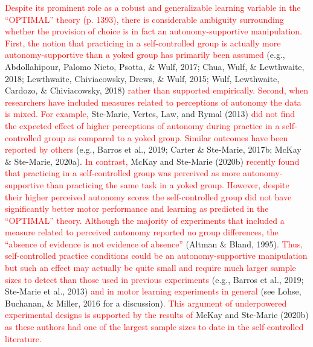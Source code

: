 \documentclass[
  english,
  man, donotrepeattitle,floatsintext]{apa7}
\begin{document}
\textcolor{red}{Despite its prominent role as a robust and generalizable learning variable in the ``OPTIMAL'' theory (p. 1393), there is considerable ambiguity surrounding whether the provision of choice is in fact an autonomy-supportive manipulation. First, the notion that practicing in a self-controlled group is actually more autonomy-supportive than a yoked group has primarily been assumed} (e.g., Abdollahipour, Palomo Nieto, Psotta, \& Wulf, 2017; Chua, Wulf, \& Lewthwaite, 2018; Lewthwaite, Chiviacowsky, Drews, \& Wulf, 2015; Wulf, Lewthwaite, Cardozo, \& Chiviacowsky, 2018) \textcolor{red}{rather than supported empirically. Second, when researchers have included measures related to perceptions of autonomy the data is mixed. For example,} Ste-Marie, Vertes, Law, and Rymal (2013) \textcolor{red}{did not find the expected effect of higher perceptions of autonomy during practice in a self-controlled group as compared to a yoked group. Similar outcomes have been reported by others} (e.g., Barros et al., 2019; Carter \& Ste-Marie, 2017b; McKay \& Ste-Marie, 2020a). \textcolor{red}{In contrast,} McKay and Ste-Marie (2020b) \textcolor{red}{recently found that practicing in a self-controlled group was perceived as more autonomy-supportive than practicing the same task in a yoked group. However, despite their higher perceived autonomy scores the self-controlled group did not have significantly better motor performance and learning as predicted in the ``OPTIMAL'' theory. Although the majority of experiments that included a measure related to perceived autonomy reported no group differences, the ``absence of evidence is not evidence of absence''} (Altman \& Bland, 1995)\textcolor{red}{. Thus, self-controlled practice conditions could be an autonomy-supportive manipulation but such an effect may actually be quite small and require much larger sample sizes to detect than those used in previous experiments} (e.g., Barros et al., 2019; Ste-Marie et al., 2013) \textcolor{red}{and in motor learning experiments in general} (see Lohse, Buchanan, \& Miller, 2016 for a discussion)\textcolor{red}{. This argument of underpowered experimental designs is supported by the results of} McKay and Ste-Marie (2020b) \textcolor{red}{as these authors had one of the largest sample sizes to date in the self-controlled literature.}
\end{document}

